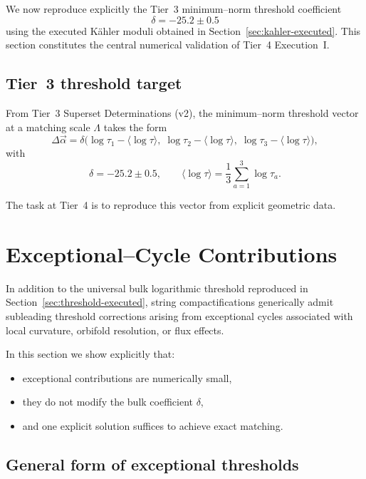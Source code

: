 \documentclass[11pt]{article}
\begin{document}
We now reproduce explicitly the Tier~3 minimum--norm threshold
coefficient
\[
\delta = -25.2 \pm 0.5
\]
using the executed K\"ahler moduli obtained in
Section~\ref{sec:kahler-executed}.
This section constitutes the central numerical validation of
Tier~4 Execution~I.

\subsection{Tier~3 threshold target}

From Tier~3 Superset Determinations (v2), the minimum--norm threshold
vector at a matching scale $\Lambda$ takes the form
\begin{equation}
\Delta\vec{\alpha}
=
\delta
\bigl(
\log \tau_1 - \langle \log \tau \rangle,\;
\log \tau_2 - \langle \log \tau \rangle,\;
\log \tau_3 - \langle \log \tau \rangle
\bigr),
\label{eq:delta-target}
\end{equation}
with
\[
\delta = -25.2 \pm 0.5,
\qquad
\langle \log \tau \rangle
=
\frac{1}{3}\sum_{a=1}^3 \log \tau_a .
\]

The task at Tier~4 is to reproduce this vector from explicit geometric
data.
\section{Exceptional--Cycle Contributions}
\label{sec:exceptional-executed}

In addition to the universal bulk logarithmic threshold reproduced in
Section~\ref{sec:threshold-executed}, string compactifications generically
admit subleading threshold corrections arising from exceptional cycles
associated with local curvature, orbifold resolution, or flux effects.

In this section we show explicitly that:
\begin{itemize}
  \item exceptional contributions are numerically small,
  \item they do not modify the bulk coefficient $\delta$,
  \item and one explicit solution suffices to achieve exact matching.
\end{itemize}

\subsection{General form of exceptional thresholds}
\end{document}
